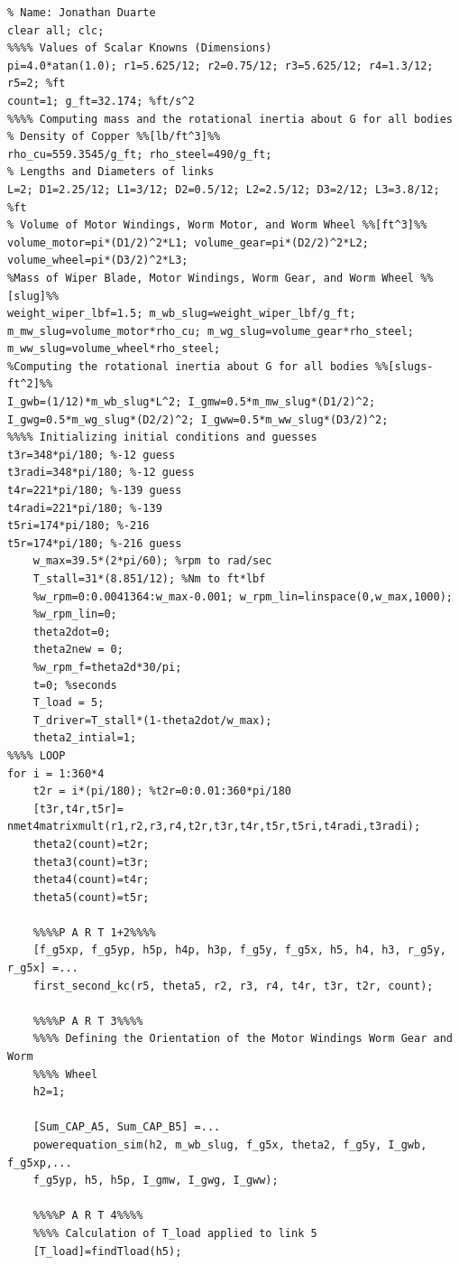\documentclass[12pt]{article}
\begin{document}
\begingroup
\fontsize{8pt}{10pt}\selectfont
\begin{verbatim}
% Name: Jonathan Duarte
clear all; clc;
%%%% Values of Scalar Knowns (Dimensions)
pi=4.0*atan(1.0); r1=5.625/12; r2=0.75/12; r3=5.625/12; r4=1.3/12; r5=2; %ft
count=1; g_ft=32.174; %ft/s^2
%%%% Computing mass and the rotational inertia about G for all bodies
% Density of Copper %%[lb/ft^3]%%
rho_cu=559.3545/g_ft; rho_steel=490/g_ft;  
% Lengths and Diameters of links
L=2; D1=2.25/12; L1=3/12; D2=0.5/12; L2=2.5/12; D3=2/12; L3=3.8/12; %ft
% Volume of Motor Windings, Worm Motor, and Worm Wheel %%[ft^3]%%
volume_motor=pi*(D1/2)^2*L1; volume_gear=pi*(D2/2)^2*L2;
volume_wheel=pi*(D3/2)^2*L3;
%Mass of Wiper Blade, Motor Windings, Worm Gear, and Worm Wheel %%[slug]%%
weight_wiper_lbf=1.5; m_wb_slug=weight_wiper_lbf/g_ft;
m_mw_slug=volume_motor*rho_cu; m_wg_slug=volume_gear*rho_steel;
m_ww_slug=volume_wheel*rho_steel;
%Computing the rotational inertia about G for all bodies %%[slugs-ft^2]%%
I_gwb=(1/12)*m_wb_slug*L^2; I_gmw=0.5*m_mw_slug*(D1/2)^2; 
I_gwg=0.5*m_wg_slug*(D2/2)^2; I_gww=0.5*m_ww_slug*(D3/2)^2;
%%%% Initializing initial conditions and guesses
t3r=348*pi/180; %-12 guess
t3radi=348*pi/180; %-12 guess
t4r=221*pi/180; %-139 guess
t4radi=221*pi/180; %-139
t5ri=174*pi/180; %-216
t5r=174*pi/180; %-216 guess
    w_max=39.5*(2*pi/60); %rpm to rad/sec
    T_stall=31*(8.851/12); %Nm to ft*lbf
    %w_rpm=0:0.0041364:w_max-0.001; w_rpm_lin=linspace(0,w_max,1000); 
    %w_rpm_lin=0;
    theta2dot=0;
    theta2new = 0;
    %w_rpm_f=theta2d*30/pi;
    t=0; %seconds
    T_load = 5;
    T_driver=T_stall*(1-theta2dot/w_max);
    theta2_intial=1;
%%%% LOOP
for i = 1:360*4
    t2r = i*(pi/180); %t2r=0:0.01:360*pi/180
    [t3r,t4r,t5r]= nmet4matrixmult(r1,r2,r3,r4,t2r,t3r,t4r,t5r,t5ri,t4radi,t3radi);
    theta2(count)=t2r;
    theta3(count)=t3r;
    theta4(count)=t4r;
    theta5(count)=t5r;
    
    %%%%P A R T 1+2%%%%
    [f_g5xp, f_g5yp, h5p, h4p, h3p, f_g5y, f_g5x, h5, h4, h3, r_g5y, r_g5x] =...
    first_second_kc(r5, theta5, r2, r3, r4, t4r, t3r, t2r, count);

    %%%%P A R T 3%%%%
    %%%% Defining the Orientation of the Motor Windings Worm Gear and Worm
    %%%% Wheel
    h2=1; 
    
    [Sum_CAP_A5, Sum_CAP_B5] =...
    powerequation_sim(h2, m_wb_slug, f_g5x, theta2, f_g5y, I_gwb, f_g5xp,...
    f_g5yp, h5, h5p, I_gmw, I_gwg, I_gww);
    
    %%%%P A R T 4%%%%
    %%%% Calculation of T_load applied to link 5
    [T_load]=findTload(h5);
   

\end{verbatim}
\end{document}
